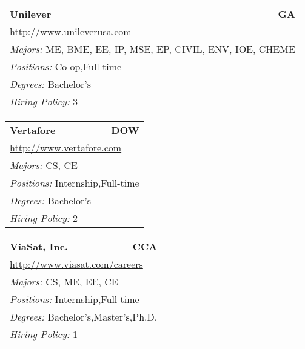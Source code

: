 \documentclass[twoside]{article}
\begin{document}
\begin{center}
\begin{multicols}{3}
\begin{FlushLeft}
\begin{minipage}{\columnwidth}
\end{minipage}
 
\begin{minipage}{\columnwidth}\begin{tabularx}{.95\columnwidth}{Xr}
                 {\Large\bf Unilever} & {\Large\bf GA}\\
    \multicolumn{2}{p{.95\columnwidth}}{\url{http://www.unileverusa.com}}\\
    \multicolumn{2}{p{.95\columnwidth}}{\emph{Majors:} ME, BME, EE, IP, MSE, EP, CIVIL, ENV, IOE, CHEME}\\
    \multicolumn{2}{p{.95\columnwidth}}{\emph{Positions:} Co-op,Full-time}\\
    \multicolumn{2}{p{.95\columnwidth}}{\emph{Degrees:} Bachelor's}\\
    \multicolumn{2}{p{.95\columnwidth}}{\emph{Hiring Policy:} 3}\\
    \end{tabularx}
    
\end{minipage}
 
\begin{minipage}{\columnwidth}\begin{tabularx}{.95\columnwidth}{Xr}
                 {\Large\bf Vertafore} & {\Large\bf DOW}\\
    \multicolumn{2}{p{.95\columnwidth}}{\url{http://www.vertafore.com}}\\
    \multicolumn{2}{p{.95\columnwidth}}{\emph{Majors:} CS, CE}\\
    \multicolumn{2}{p{.95\columnwidth}}{\emph{Positions:} Internship,Full-time}\\
    \multicolumn{2}{p{.95\columnwidth}}{\emph{Degrees:} Bachelor's}\\
    \multicolumn{2}{p{.95\columnwidth}}{\emph{Hiring Policy:} 2}\\
    \end{tabularx}
    
\end{minipage}
 
\begin{minipage}{\columnwidth}\begin{tabularx}{.95\columnwidth}{Xr}
                 {\Large\bf ViaSat, Inc.} & {\Large\bf CCA}\\
    \multicolumn{2}{p{.95\columnwidth}}{\url{http://www.viasat.com/careers}}\\
    \multicolumn{2}{p{.95\columnwidth}}{\emph{Majors:} CS, ME, EE, CE}\\
    \multicolumn{2}{p{.95\columnwidth}}{\emph{Positions:} Internship,Full-time}\\
    \multicolumn{2}{p{.95\columnwidth}}{\emph{Degrees:} Bachelor's,Master's,Ph.D.}\\
    \multicolumn{2}{p{.95\columnwidth}}{\emph{Hiring Policy:} 1}\\
    \end{tabularx}
    

\end{minipage}
\end{FlushLeft}
\end{multicols}
\end{center}
\end{document}
